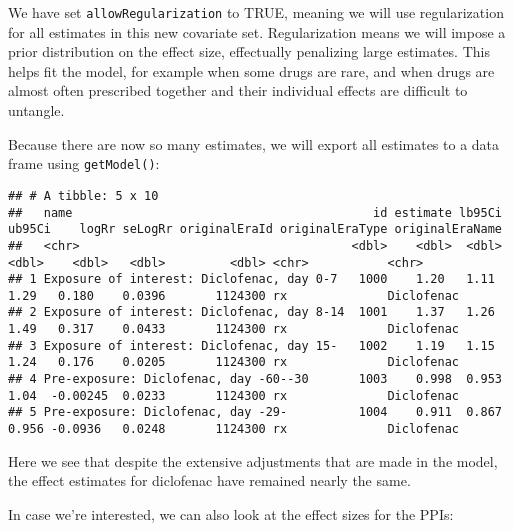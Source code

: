 \documentclass[
]{article}
\newenvironment{Shaded}{\begin{snugshade}}{\end{snugshade}}
\newcommand{\KeywordTok}[1]{\textcolor[rgb]{0.13,0.29,0.53}{\textbf{#1}}}
\newcommand{\NormalTok}[1]{#1}
\newcommand{\OperatorTok}[1]{\textcolor[rgb]{0.81,0.36,0.00}{\textbf{#1}}}
\newcommand{\StringTok}[1]{\textcolor[rgb]{0.31,0.60,0.02}{#1}}
\begin{document}
We have set \texttt{allowRegularization} to TRUE, meaning we will use
regularization for all estimates in this new covariate set.
Regularization means we will impose a prior distribution on the effect
size, effectually penalizing large estimates. This helps fit the model,
for example when some drugs are rare, and when drugs are almost often
prescribed together and their individual effects are difficult to
untangle.

Because there are now so many estimates, we will export all estimates to
a data frame using \texttt{getModel()}:

\begin{Shaded}
\end{Shaded}

\begin{verbatim}
## # A tibble: 5 x 10
##   name                                          id estimate lb95Ci ub95Ci    logRr seLogRr originalEraId originalEraType originalEraName
##   <chr>                                      <dbl>    <dbl>  <dbl>  <dbl>    <dbl>   <dbl>         <dbl> <chr>           <chr>          
## 1 Exposure of interest: Diclofenac, day 0-7   1000    1.20   1.11   1.29   0.180    0.0396       1124300 rx              Diclofenac     
## 2 Exposure of interest: Diclofenac, day 8-14  1001    1.37   1.26   1.49   0.317    0.0433       1124300 rx              Diclofenac     
## 3 Exposure of interest: Diclofenac, day 15-   1002    1.19   1.15   1.24   0.176    0.0205       1124300 rx              Diclofenac     
## 4 Pre-exposure: Diclofenac, day -60--30       1003    0.998  0.953  1.04  -0.00245  0.0233       1124300 rx              Diclofenac     
## 5 Pre-exposure: Diclofenac, day -29-          1004    0.911  0.867  0.956 -0.0936   0.0248       1124300 rx              Diclofenac
\end{verbatim}

Here we see that despite the extensive adjustments that are made in the
model, the effect estimates for diclofenac have remained nearly the
same.

In case we're interested, we can also look at the effect sizes for the
PPIs:

\begin{Shaded}
\end{Shaded}
\end{document}
